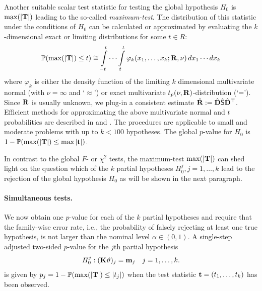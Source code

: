 \documentclass[12pt]{article}
\begin{document}
Another suitable scalar test statistic for testing the global hypothesis 
$H_0$ is $\max(|\T|)$ leading to the so-called \emph{maximum-test}. 
The distribution of this statistic under the conditions of $H_0$
can be calculated or approximated
by evaluating the $k$-dimensional exact or limiting distributions for some $t \in R$:
\begin{eqnarray*}
\Prob(\max(|\T|) \le t)  \cong  \int\limits_{-t}^t \cdots \int\limits_{t}^t 
\varphi_k(x_1, \dots, x_k; \Cor, \nu) \, dx_1 \cdots dx_k 
\end{eqnarray*}
where $\varphi_k$ is either the density function of the limiting $k$
dimensional multivariate
normal (with $\nu = \infty$ and `$\approx$') or exact multivariate $t_p(\nu,
\Cor)$-distribution (`='). 
Since $\Cor$ is usually unknown, we plug-in a consistent estimate
$\hat{\Cor} := \hat{\D} \hat{\S} \hat{\D}^\top$. Efficient methods
for approximating the above multivariate normal and $t$ 
probabilities are described in \cite{Genz1992,GenzBretz1999,BretzGenzHothorn2001}
and \cite{GenzBretz2002}. The procedures
are applicable to small and moderate problems with up to $k < 100$ hypotheses.
The global $p$-value for $H_0$ is $1 - \Prob(\max(|\T|) \le \max|\tt|)$.

In contrast to the global $F$- or $\chi^2$ tests, 
the maximum-test $\max(|\T|)$ can shed light 
on the question which of the $k$ partial hypotheses $H_0^j, j = 1, \dots, k$ 
lead to the rejection of the global hypothesis $H_0$ as will be shown in the
next paragraph. 

\paragraph{Simultaneous tests.}

We now obtain one $p$-value for each of the $k$ partial hypotheses and
require that the family-wise error rate, i.e., the probability
of falsely rejecting at least one true hypothesis, is not larger than
the nominal level $\alpha \in (0, 1)$. A single-step adjusted two-sided 
$p$-value for the $j$th partial hypothesis 
\begin{eqnarray*}
H_0^j: (\K \vartheta)_j = \m_j \quad j = 1, \dots, k.
\end{eqnarray*}
is given by $p_j = 1 - \Prob(\max(|\T|) \le |t_j|)$ when the test statistic 
$\tt  = (t_1, \dots, t_k)$
has been observed. 
\end{document}
